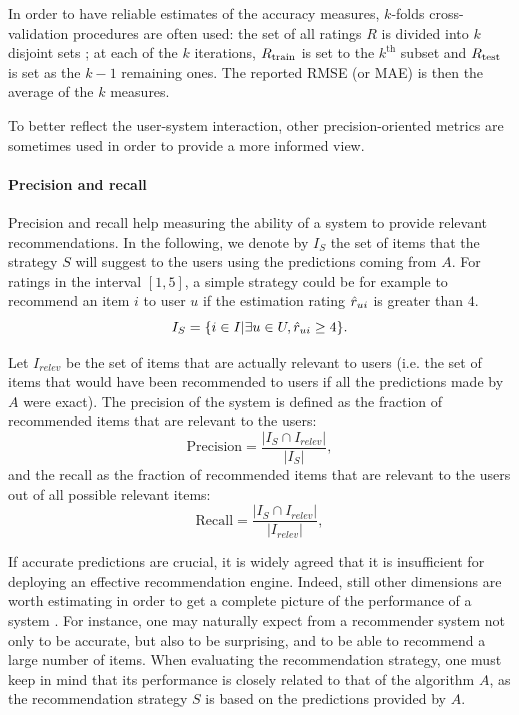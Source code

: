 In order to have reliable estimates of the accuracy measures, $k$-folds
cross-validation procedures are often used: the set of all ratings $R$ is
divided into $k$ disjoint sets ; at each of the $k$ iterations, $R_{\text{train}}$ is set
to the $k^{\text{th}}$ subset and $R_{\text{test}}$ is set as the $k - 1$ remaining
ones. The reported RMSE (or MAE) is then the average of the $k$ measures.

To better reflect the user-system interaction, other precision-oriented metrics
are sometimes used in order to provide a more informed view.

\paragraph{Precision and recall\\}
Precision and recall help measuring the ability of a system to provide
relevant recommendations.
In the following, we denote by $I_{S}$ the set of items that the strategy
$S$ will suggest to the users using the predictions coming from $A$. For
ratings in the interval $[1, 5]$, a simple strategy could be for example to
recommend an item $i$ to user $u$ if the estimation rating $\hat{r}_{ui}$ is
greater than $4$.  $$I_S = \{i \in I | \exists u \in U, \hat{r}_{ui} \geq
4\}.$$

Let $I_{relev}$ be the set of items that are actually relevant to users (i.e.
the set of items that would have been recommended to users if all the
predictions made by $A$ were exact).
The precision of the system is defined as the fraction of recommended items that
are relevant to the users:
$$\text{Precision} = \frac{|I_{S} \cap I_{relev}|}{|I_{S}|},$$
and the recall as the fraction of recommended items that are relevant to the
users out of all possible relevant items:
$$\text{Recall} = \frac{|I_{S} \cap I_{relev}|}{|I_{relev}|},$$

If accurate predictions are crucial, it is widely agreed that it is
insufficient for deploying an effective recommendation engine. Indeed, still
other dimensions are worth estimating in order to get a complete picture of the
performance of a system
\cite{NeeRieKonACM2006,HerKonJohTerRieACM2004,KamBriRecSys2014}.
For instance, one may naturally expect from a recommender system
not only to be accurate, but also to be surprising, and to be able to recommend
a large number of items. When evaluating the recommendation strategy, one must
keep in mind that its performance is closely related to that of the algorithm
$A$, as the recommendation strategy $S$ is based on the predictions provided by
$A$.


